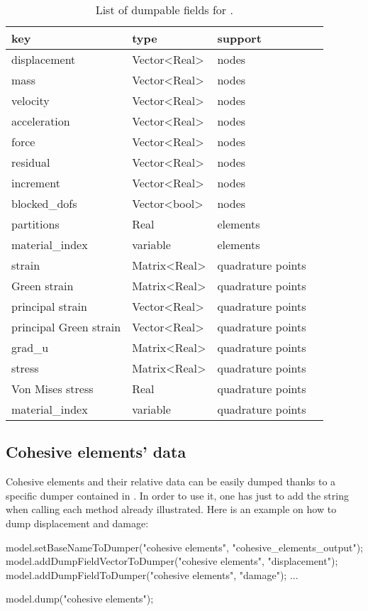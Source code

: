 \begin{table}
  \centering
  \begin{tabular}{llll}
    \toprule
    key          &    type      & support \\
    \midrule
    displacement & Vector<Real> & nodes  \\
    mass         & Vector<Real> & nodes  \\
    velocity     & Vector<Real> & nodes  \\
    acceleration & Vector<Real> & nodes  \\
    force	       & Vector<Real> & nodes  \\
    residual     & Vector<Real> & nodes  \\
    increment     & Vector<Real> & nodes  \\
    {blocked\_dofs}  & Vector<bool> & nodes  \\    
    partitions   & Real         & elements \\
    material\_index & variable  & elements\\    
    strain & Matrix<Real> & quadrature points  \\
    Green strain & Matrix<Real> & quadrature points  \\
    principal strain & Vector<Real> & quadrature points  \\
    principal Green strain & Vector<Real> & quadrature points  \\
    grad\_u & Matrix<Real> & quadrature points  \\    
    stress & Matrix<Real> & quadrature points  \\
    Von Mises stress & Real & quadrature points  \\        
    material\_index & variable  & quadrature points \\
    \bottomrule
  \end{tabular}
  \caption{List of dumpable fields for .}
  \label{tab:io:smm_field_list}
\end{table}

\subsection{Cohesive elements' data}
Cohesive elements and their relative data can be easily dumped thanks
to a specific dumper contained in
. In order to use it, one has just
to add the string  when calling each method
already illustrated. Here is an example on how to dump displacement
and damage:
\begin{cpp}
  model.setBaseNameToDumper("cohesive elements", "cohesive_elements_output");
  model.addDumpFieldVectorToDumper("cohesive elements", "displacement");
  model.addDumpFieldToDumper("cohesive elements", "damage");
  ...

  model.dump("cohesive elements");
\end{cpp}

